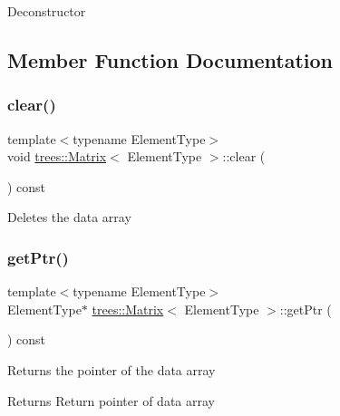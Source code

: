 Deconstructor 

\subsection{Member Function Documentation}
\mbox{\label{classtrees_1_1_matrix_a2ed5574e99debc9db90ccc50afe6aa7a}} 
\subsubsection{\texorpdfstring{clear()}{clear()}}
{\footnotesize\ttfamily template$<$typename Element\+Type$>$ \\
void \hyperlink{classtrees_1_1_matrix}{trees\+::\+Matrix}$<$ Element\+Type $>$\+::clear (\begin{DoxyParamCaption}{ }\end{DoxyParamCaption}) const\hspace{0.3cm}{\ttfamily [inline]}}

Deletes the data array \mbox{\label{classtrees_1_1_matrix_ae4c759a614daf9f1f019566eca92edab}} 
\subsubsection{\texorpdfstring{get\+Ptr()}{getPtr()}}
{\footnotesize\ttfamily template$<$typename Element\+Type$>$ \\
Element\+Type$\ast$ \hyperlink{classtrees_1_1_matrix}{trees\+::\+Matrix}$<$ Element\+Type $>$\+::get\+Ptr (\begin{DoxyParamCaption}{ }\end{DoxyParamCaption}) const\hspace{0.3cm}{\ttfamily [inline]}}

Returns the pointer of the data array

\begin{DoxyReturn}{Returns}
Return pointer of data array 
\end{DoxyReturn}
\mbox{\label{classtrees_1_1_matrix_a1467c63bceec8a38771c845fad759784}} 
